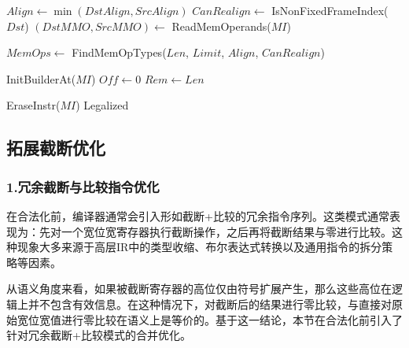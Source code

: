 \begin{algorithm}[htbp]
	\SetAlgoLined
	\linespread{1}\selectfont
	
	\caption{lowerMemcpy: inline memcpy as loads/stores}
	\label{alg:lower-memcpy}
	
	$Align \leftarrow \min(DstAlign, SrcAlign)$\;
	$CanRealign \leftarrow$ IsNonFixedFrameIndex($Dst$)\;
	$(DstMMO,SrcMMO) \leftarrow$ ReadMemOperands($MI$)\;
	
	$MemOps \leftarrow$ FindMemOpTypes($Len$, $Limit$, $Align$, $CanRealign$)\;
	
	
	InitBuilderAt($MI$)\;
	$Off \leftarrow 0$\;
	$Rem \leftarrow Len$\;
	
	
	EraseInstr($MI$)\;
	\Return Legalized\;
\end{algorithm}


\subsection{拓展截断优化}


\subsubsection{1.冗余截断与比较指令优化}
在合法化前，编译器通常会引入形如截断+比较的冗余指令序列。这类模式通常表现为：先对一个宽位宽寄存器执行截断操作，之后再将截断结果与零进行比较。这种现象大多来源于高层IR中的类型收缩、布尔表达式转换以及通用指令的拆分策略等因素。

\par

从语义角度来看，如果被截断寄存器的高位仅由符号扩展产生，那么这些高位在逻辑上并不包含有效信息。在这种情况下，对截断后的结果进行零比较，与直接对原始宽位宽值进行零比较在语义上是等价的。基于这一结论，本节在合法化前引入了针对冗余截断+比较模式的合并优化。


